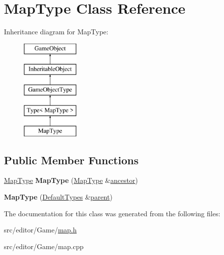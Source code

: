\hypertarget{class_map_type}{\section{\-Map\-Type \-Class \-Reference}
\label{class_map_type}
}
\-Inheritance diagram for \-Map\-Type\-:\begin{figure}[H]
\begin{center}
\leavevmode
\includegraphics[height=5.000000cm]{class_map_type}
\end{center}
\end{figure}
\subsection*{\-Public \-Member \-Functions}
\begin{DoxyCompactItemize}
\item 
\hypertarget{class_map_type_aa2304487b4989920021c656d404ad893}{\hyperlink{class_map_type}{\-Map\-Type} {\bfseries \-Map\-Type} (\hyperlink{class_map_type}{\-Map\-Type} \&\hyperlink{class_inheritable_object_ac87a3c55ca4be252c527a29fe162bb15}{ancestor})}\label{class_map_type_aa2304487b4989920021c656d404ad893}

\item 
\hypertarget{class_map_type_affc4d021aa814cfc93096498b0395ba2}{{\bfseries \-Map\-Type} (\hyperlink{class_default_types}{\-Default\-Types} \&\hyperlink{class_game_object_af3deaf39cde23c189765634e32e95bb4}{parent})}\label{class_map_type_affc4d021aa814cfc93096498b0395ba2}

\end{DoxyCompactItemize}


\-The documentation for this class was generated from the following files\-:\begin{DoxyCompactItemize}
\item 
src/editor/\-Game/\hyperlink{map_8h}{map.\-h}\item 
src/editor/\-Game/map.\-cpp\end{DoxyCompactItemize}
